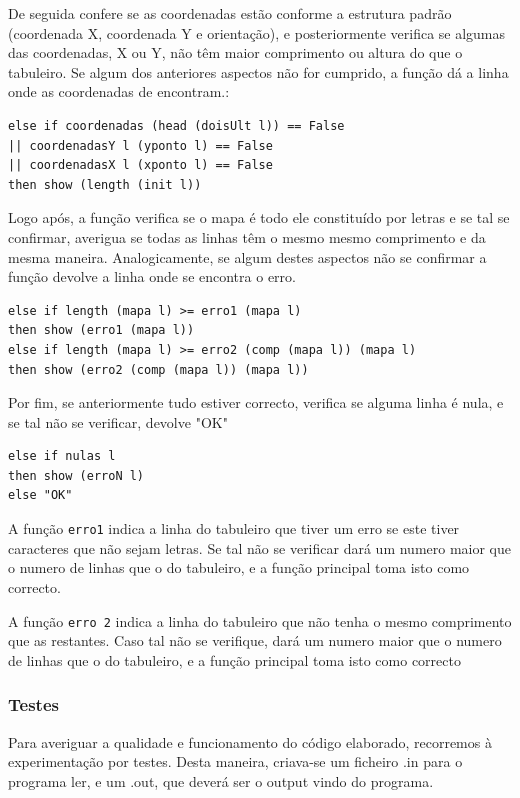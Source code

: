 \documentclass[a4paper]{article}
\begin{document}
De seguida confere se as coordenadas estão conforme a estrutura padrão (coordenada X, coordenada Y e orientação), e posteriormente verifica se algumas das coordenadas, X ou Y, não têm maior comprimento ou altura do que o tabuleiro. Se algum dos anteriores aspectos não for cumprido, a função dá a linha onde as coordenadas de encontram.:

\begin{lstlisting}[frame=single]
else if coordenadas (head (doisUlt l)) == False 
|| coordenadasY l (yponto l) == False
|| coordenadasX l (xponto l) == False 
then show (length (init l))
\end{lstlisting}

Logo após, a função verifica se o mapa é todo ele constituído por letras e se tal se confirmar, averigua se todas as linhas têm o mesmo mesmo comprimento e da mesma maneira. Analogicamente, se algum destes aspectos não se confirmar a função devolve a linha onde se encontra o erro.
\begin{lstlisting}[frame=single]
else if length (mapa l) >= erro1 (mapa l) 
then show (erro1 (mapa l))
else if length (mapa l) >= erro2 (comp (mapa l)) (mapa l) 
then show (erro2 (comp (mapa l)) (mapa l))
\end{lstlisting}
Por fim, se anteriormente tudo estiver correcto, verifica se alguma linha é nula, e se tal não se verificar, devolve "OK"

\begin{lstlisting}[frame=single]
else if nulas l 
then show (erroN l)
else "OK"
\end{lstlisting}

A função \verb|erro1| indica a linha do tabuleiro que tiver um erro se este tiver caracteres que não sejam letras. Se tal não se verificar dará um numero maior que o numero de linhas que o do tabuleiro, e a função principal toma isto como correcto.

A função \verb|erro 2| indica a linha do tabuleiro que não tenha o mesmo comprimento que as restantes. Caso tal não se verifique, dará um numero maior que o numero de linhas que o do tabuleiro, e a função principal toma isto como correcto

\subsubsection{Testes}

Para averiguar a qualidade e funcionamento do código elaborado, recorremos à experimentação por testes. Desta maneira, criava-se um ficheiro .in para o programa ler, e um .out, que deverá ser o output vindo do programa.
\end{document}
